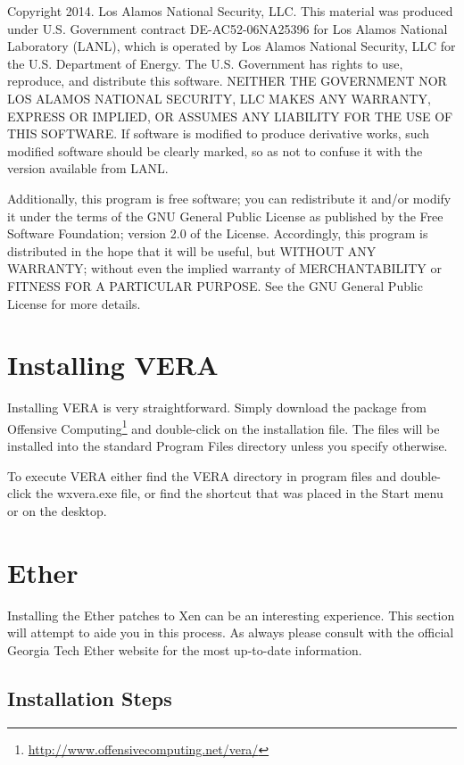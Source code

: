 \documentclass[11pt]{article}
\begin{document}
Copyright 2014.  Los Alamos National Security, LLC. This material was produced under U.S. Government contract DE-AC52-06NA25396 for Los Alamos National Laboratory (LANL), which is operated by Los Alamos National Security, LLC for the U.S. Department of Energy. The U.S. Government has rights to use, reproduce, and distribute this software.  NEITHER THE GOVERNMENT NOR LOS ALAMOS NATIONAL SECURITY, LLC MAKES ANY WARRANTY, EXPRESS OR IMPLIED, OR ASSUMES ANY LIABILITY FOR THE USE OF THIS SOFTWARE.  If software is modified to produce derivative works, such modified software should be clearly marked, so as not to confuse it with the version available from LANL.

Additionally, this program is free software; you can redistribute it and/or modify it under the terms of the GNU General Public License as published by the Free Software Foundation; version 2.0 of the License. Accordingly, this program is distributed in the hope that it will be useful, but WITHOUT ANY WARRANTY; without even the implied warranty of MERCHANTABILITY or FITNESS FOR A PARTICULAR PURPOSE. See the GNU General Public License for more details.

\section{Installing VERA}

Installing VERA is very straightforward. Simply download the package
from Offensive Computing\footnote{\url{http://www.offensivecomputing.net/vera/}} and
double-click on the installation file. The files will be installed
into the standard Program Files directory unless you specify
otherwise. 

To execute VERA either find the VERA directory in program files and
double-click the wxvera.exe file, or find the shortcut that was placed
in the Start menu or on the desktop. 

\section{Ether}

Installing the Ether patches to Xen can be an interesting
experience. This section will attempt to aide you in this process. As
always please consult with the official Georgia Tech Ether website for
the most up-to-date information.

\subsection{Installation Steps}
\end{document}
